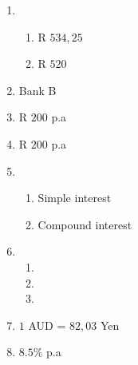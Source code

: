 \begin{multicols}{3}
\begin{enumerate}[label=\textbf{\arabic*}.]
	\item %
	\begin{enumerate}[noitemsep, label=\textbf{(\alph*)} ]
	    \item R $534,25$%
	    \item R $520$%
	\end{enumerate}

	\item Bank B%

	\item R $200$ p.a%

	\item R $200$ p.a%

	\item %
	\begin{enumerate}[noitemsep, label=\textbf{(\alph*)} ]
	    \item Simple interest%

	    \item Compound interest%
	\end{enumerate}

	\item %
	\begin{enumerate}[noitemsep, label=\textbf{(\alph*)} ]
	    \item %
	    \item %
	    \item %
	\end{enumerate}

	\item $1$ AUD = $82,03$ Yen%

	\item $8.5\%$ p.a%
    \end{enumerate}

\end{multicols}

